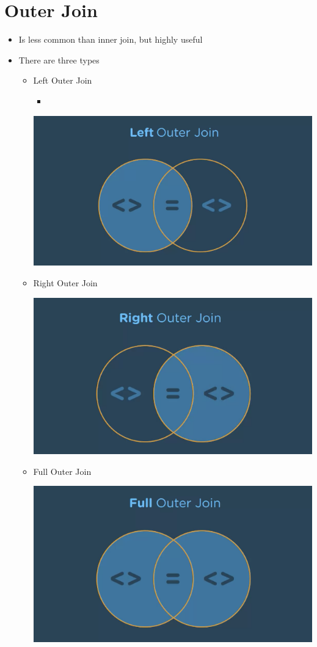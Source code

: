 \documentclass[12pt]{article}
\begin{document}
\bigskip

\section{Outer Join}

\bigskip

\begin{itemize}
    \item Is less common than inner join, but highly useful
    \item There are three types
    \begin{itemize}
        \item Left Outer Join
        \begin{itemize}
            \item
        \end{itemize}

        \begin{center}
        \includegraphics[width=0.6\linewidth]{images/part_4_notes_5.png}
        \end{center}

        \bigskip

        \item Right Outer Join

        \begin{center}
        \includegraphics[width=0.6\linewidth]{images/part_4_notes_6.png}
        \end{center}

        \item Full Outer Join

        \begin{center}
        \includegraphics[width=0.6\linewidth]{images/part_4_notes_7.png}
        \end{center}
    \end{itemize}
\end{itemize}
\end{document}
